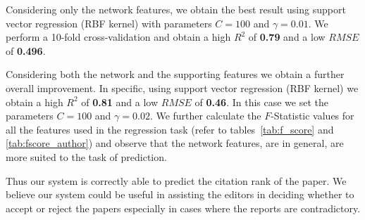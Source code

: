  Considering only the network features, we obtain the best result using support vector regression (RBF kernel) with parameters $C=100$ and $\gamma=0.01$. We perform a 10-fold cross-validation and obtain a high $R^2$ of {\bf 0.79} and a low $RMSE$ of {\bf 0.496}. 

 Considering both the network and the supporting features we obtain a further overall improvement. In specific, using support vector regression (RBF kernel) we obtain a high $R^2$ of {\bf 0.81} and a low $RMSE$ of {\bf 0.46}. In this case we set the parameters $C=100$ and $\gamma=0.02$. We further calculate the $F$-Statistic values for all the features used in the regression task (refer to tables~\ref{tab:f_score} and \ref{tab:fscore_author}) and observe that the network features, are in general, are more suited to the task of prediction.


Thus our system is correctly able to predict the citation rank of the paper. We believe our system could be useful in assisting the editors in deciding whether to accept or reject the papers especially in cases where the reports are contradictory. 
\medskip